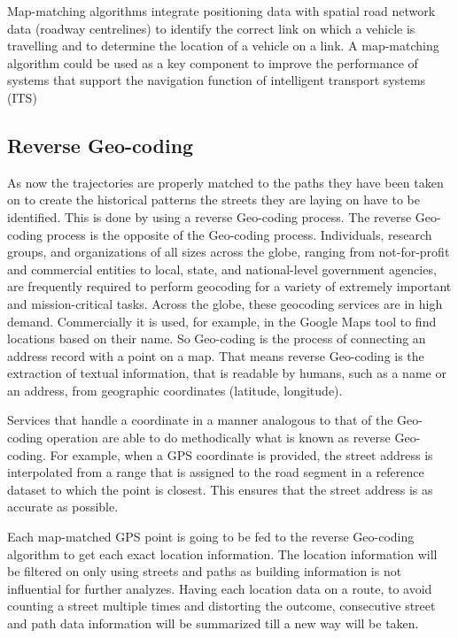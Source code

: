 Map-matching algorithms integrate positioning data with spatial road network data (roadway centrelines) to identify the correct link on which a vehicle is travelling and to determine the location of a vehicle on a link. A map-matching algorithm could be used as a key component to improve the performance of systems that support the navigation function of intelligent transport systems (ITS) \autocite[]{Quddus2007}


\subsection{Reverse Geo-coding}

As now the trajectories are properly matched to the paths they have been taken on to create the historical patterns the streets they are laying on have to be identified. This is done by using a reverse Geo-coding process. The reverse Geo-coding process is the opposite of the Geo-coding process. Individuals, research groups, and organizations of all sizes across the globe, ranging from not-for-profit and commercial entities to local, state, and national-level government agencies, are frequently required to perform geocoding for a variety of extremely important and mission-critical tasks. Across the globe, these geocoding services are in high demand. \autocite[]{Goldberg2013} Commercially it is used, for example,  in the Google Maps tool to find locations based on their name. So Geo-coding is the process of connecting an address record with a point on a map. \autocite[]{Ratcliffe2001} That means reverse Geo-coding is the extraction of textual information, that is readable by humans, such as a name or an address, from geographic coordinates (latitude, longitude). \autocite[]{Kounadi2013}

Services that handle a coordinate in a manner analogous to that of the Geo-coding operation are able to do methodically what is known as reverse Geo-coding.
For example, when a GPS coordinate is provided, the street address is interpolated from a range that is assigned to the road segment in a reference dataset to which the point is closest. This ensures that the street address is as accurate as possible. 

Each map-matched GPS point is going to be fed to the reverse Geo-coding algorithm to get each exact location information. The location information will be filtered on only using streets and paths as building information is not influential for further analyzes. Having each location data on a route, to avoid counting a street multiple times and distorting the outcome, consecutive street and path data information will be summarized till a new way will be taken.   

